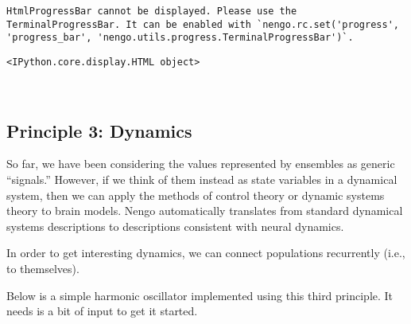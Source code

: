 \documentclass[11pt]{article}
\newcommand{\prompt}[4]{
        \llap{{\color{#2}[#3]: #4}}\vspace{-1.25em}
    }
\begin{document}
    
    
    
    
    \begin{verbatim}
HtmlProgressBar cannot be displayed. Please use the TerminalProgressBar. It can be enabled with `nengo.rc.set('progress', 'progress_bar', 'nengo.utils.progress.TerminalProgressBar')`.
    \end{verbatim}

    
    
    
            \begin{tcolorbox}[breakable, boxrule=.5pt, size=fbox, pad at break*=1mm, opacityfill=0]
\prompt{Out}{outcolor}{23}{\hspace{3.5pt}}
\begin{Verbatim}[commandchars=\\\{\}]
<IPython.core.display.HTML object>
\end{Verbatim}
\end{tcolorbox}
        
    \begin{center}
    \end{center}
    { \hspace*{\fill} \\}
    
    \hypertarget{principle-3-dynamics}{%
\subsection{Principle 3: Dynamics}\label{principle-3-dynamics}}

So far, we have been considering the values represented by ensembles as
generic ``signals.'' However, if we think of them instead as state
variables in a dynamical system, then we can apply the methods of
control theory or dynamic systems theory to brain models. Nengo
automatically translates from standard dynamical systems descriptions to
descriptions consistent with neural dynamics.

In order to get interesting dynamics, we can connect populations
recurrently (i.e., to themselves).

Below is a simple harmonic oscillator implemented using this third
principle. It needs is a bit of input to get it started.
\end{document}

